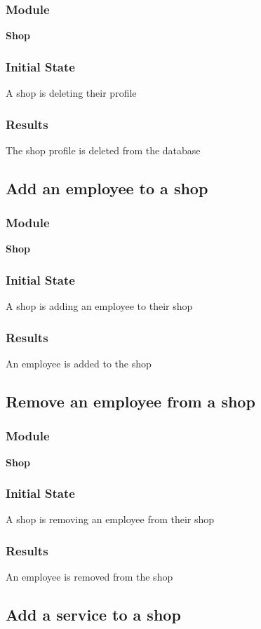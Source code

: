 \documentclass[12pt, titlepage]{article}
\begin{document}
    \subsubsection{Module}
    \textbf{Shop}
    \subsubsection{Initial State}
    A shop is deleting their profile
    \subsubsection{Results}
    The shop profile is deleted from the database

\subsection{Add an employee to a shop}
    \subsubsection{Module}
    \textbf{Shop}
    \subsubsection{Initial State}
    A shop is adding an employee to their shop
    \subsubsection{Results}
    An employee is added to the shop

\subsection{Remove an employee from a shop}
    \subsubsection{Module}
    \textbf{Shop}
    \subsubsection{Initial State}
    A shop is removing an employee from their shop
    \subsubsection{Results}
    An employee is removed from the shop

\subsection{Add a service to a shop}
\end{document}
